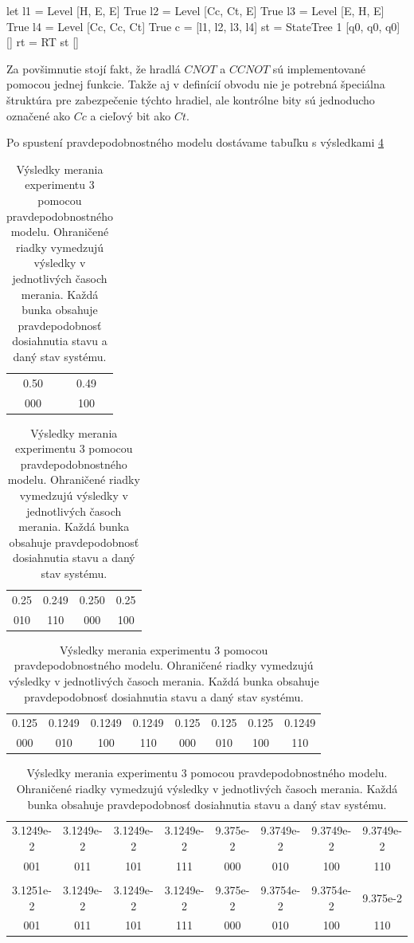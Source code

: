 \begin{code}
let l1 = Level [H, E, E] True
    l2 = Level [Cc, Ct, E] True
    l3 = Level [E, H, E] True
    l4 = Level [Cc, Cc, Ct] True
    c = [l1, l2, l3, l4]
    st = StateTree 1 [q0, q0, q0] []
    rt = RT st []
\end{code}

Za povšimnutie stojí fakt, že hradlá \(CNOT\) a \(CCNOT\) sú implementované
pomocou jednej funkcie. Takže aj v definícií obvodu nie je potrebná špeciálna 
štruktúra pre zabezpečenie týchto hradiel, ale kontrólne bity sú jednoducho
označené ako \(Cc\) a cieľový bit ako \(Ct\).

Po spustení pravdepodobnostného modelu dostávame tabuľku s výsledkami 
\ref{expr3_results}

\begin{table}
\centering

\begin{tabular}{|c|c|}
\hline
0.50 & 0.49 \\ 
000 & 100 \\ 
\hline
\end{tabular}

\begin{tabular}{|c|c|c|c|}
\hline
0.25 & 0.249 & 0.250 & 0.25 \\ 
010 & 110 & 000 & 100 \\ 
\hline
\end{tabular}

\begin{tabular}{|c|c|c|c|c|c|c|c|}
\hline
0.125 & 0.1249 & 0.1249 & 0.1249 & 0.125 & 0.125 & 0.125 & 0.1249 \\ 
000 & 010 & 100 & 110 & 000 & 010 & 100 & 110 \\ 
\hline
\end{tabular}

\begin{tabular}{|c|c|c|c|c|c|c|c|}
\hline
3.1249e-2 & 3.1249e-2 & 3.1249e-2 & 3.1249e-2 & 9.375e-2 & 9.3749e-2 & 9.3749e-2 & 9.3749e-2  \\ 
001 & 011 & 101 & 111 & 000 & 010 & 100 & 110  \\ 

& & & & & & & \\

3.1251e-2 & 3.1249e-2 & 3.1249e-2 & 3.1249e-2 & 9.375e-2 & 9.3754e-2 & 9.3754e-2 & 9.375e-2 \\
001 & 011 & 101 & 111 & 000 & 010 & 100 & 110 \\
\hline
\end{tabular}

\caption{\label{expr3_results} Výsledky merania experimentu 3 pomocou
pravdepodobnostného modelu. Ohraničené riadky vymedzujú výsledky v jednotlivých
 časoch merania. Každá bunka obsahuje pravdepodobnosť dosiahnutia stavu a 
daný stav systému.}
\end{table}

